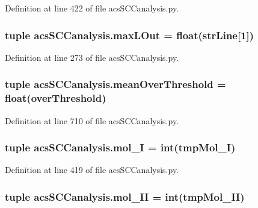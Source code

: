 Definition at line 422 of file acs\-S\-C\-Canalysis.\-py.

\hypertarget{a00128_a47da7b9153a0e4a33512f6d2675b8c1a}{
\subsubsection[{max\-L\-Out}]{\setlength{\rightskip}{0pt plus 5cm}tuple acs\-S\-C\-Canalysis.\-max\-L\-Out = float({\bf str\-Line}\mbox{[}1\mbox{]})}}\label{a00128_a47da7b9153a0e4a33512f6d2675b8c1a}


Definition at line 273 of file acs\-S\-C\-Canalysis.\-py.

\hypertarget{a00128_af10c3623be709892f4bdc4df5a3d52b0}{
\subsubsection[{mean\-Over\-Threshold}]{\setlength{\rightskip}{0pt plus 5cm}tuple acs\-S\-C\-Canalysis.\-mean\-Over\-Threshold = float({\bf over\-Threshold})}}\label{a00128_af10c3623be709892f4bdc4df5a3d52b0}


Definition at line 710 of file acs\-S\-C\-Canalysis.\-py.

\hypertarget{a00128_ae13d6607ffa236891a9af05bfa88cfcc}{
\subsubsection[{mol\-\_\-\-I}]{\setlength{\rightskip}{0pt plus 5cm}tuple acs\-S\-C\-Canalysis.\-mol\-\_\-\-I = int(tmp\-Mol\-\_\-\-I)}}\label{a00128_ae13d6607ffa236891a9af05bfa88cfcc}


Definition at line 419 of file acs\-S\-C\-Canalysis.\-py.

\hypertarget{a00128_a8f2878f5909e4aeb9155a1103eaba413}{
\subsubsection[{mol\-\_\-\-I\-I}]{\setlength{\rightskip}{0pt plus 5cm}tuple acs\-S\-C\-Canalysis.\-mol\-\_\-\-I\-I = int(tmp\-Mol\-\_\-\-I\-I)}}\label{a00128_a8f2878f5909e4aeb9155a1103eaba413}


